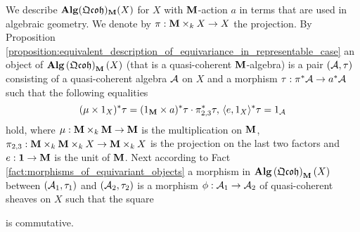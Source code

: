 \begin{remark}\label{remark:description_of_equivariant_qc_algebras_in_the_usual_way}
We describe $\mathbf{Alg}(\mathfrak{Qcoh})_{\mathbf{M}}(X)$ for $X$ with $\mathbf{M}$-action $a$ in terms that are used in algebraic geometry. We denote by $\pi:\mathbf{M}\times_kX\rightarrow X$ the projection. By Proposition \ref{proposition:equivalent_description_of_equivariance_in_representable_case} an object of $\mathbf{Alg}\left(\mathfrak{Qcoh}\right)_{\mathbf{M}}(X)$ (that is a quasi-coherent $\mathbf{M}$-algebra) is a pair $({\mathcal A},\tau)$ consisting of a quasi-coherent algebra ${\mathcal A}$ on $X$ and a morphism $\tau:\pi^*{\mathcal A} \rightarrow a^* {\mathcal A}$ such that the following equalities
$$(\mu \times 1_X)^*\tau = (1_{\mathbf{M}} \times  a)^*\tau \cdot \pi_{2,3}^*\tau,\,\langle e, 1_{X} \rangle^*\tau = 1_{{\mathcal A}}$$
hold, where $\mu: \mathbf{M} \times_k \mathbf{M} \rightarrow \mathbf{M}$ is the multiplication on $\mathbf{M}$, $\pi_{2,3}:\mathbf{M}\times_k  \mathbf{M} \times_k  X \rightarrow \mathbf{M} \times_k X$ is the projection on the last two factors and $e:\mathbf{1}\rightarrow \mathbf{M}$ is the unit of $\mathbf{M}$. Next according to Fact \ref{fact:morphisms_of_equivariant_objects} a morphism in $\mathbf{Alg}\left(\mathfrak{Qcoh}\right)_{\mathbf{M}}(X)$ between $({\mathcal A}_1,\tau_1)$ and $({\mathcal A}_2,\tau_2)$ is a morphism $\phi:{\mathcal A}_1\rightarrow {\mathcal A}_2$ of quasi-coherent sheaves on $X$ such that the square
\begin{center}
\end{center}
is commutative.
\end{remark}

